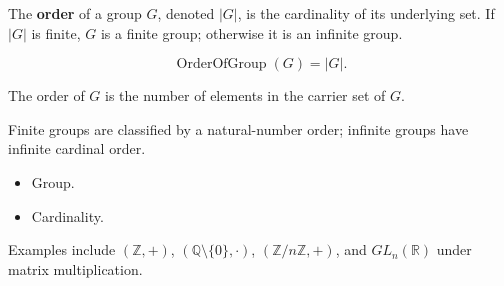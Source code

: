\begin{definition}
\label{def:order-of-a-group}
The \textbf{order} of a group $G$, denoted $|G|$, is the cardinality of its
underlying set.  If $|G|$ is finite, $G$ is a finite group; otherwise it is an
infinite group.
\end{definition}

\begin{remark*}
\[
\operatorname{OrderOfGroup}(G)=|G|.
\]
\end{remark*}

\begin{remark*}
The order of $G$ is the number of elements in the carrier set of $G$.
\end{remark*}


\begin{remark*}[Interpretation]
Finite groups are classified by a natural-number order; infinite groups have
infinite cardinal order.
\end{remark*}

\begin{remark*}[Dependencies]
\begin{itemize}
  \item Group.
  \item Cardinality.
\end{itemize}
\end{remark*}

\begin{remark*}[Examples]
Examples include $(\mathbb{Z},+)$, $(\mathbb{Q}\setminus\{0\},\cdot)$,
$(\mathbb{Z}/n\mathbb{Z},+)$, and $GL_n(\mathbb{R})$ under matrix
multiplication.
\end{remark*}
